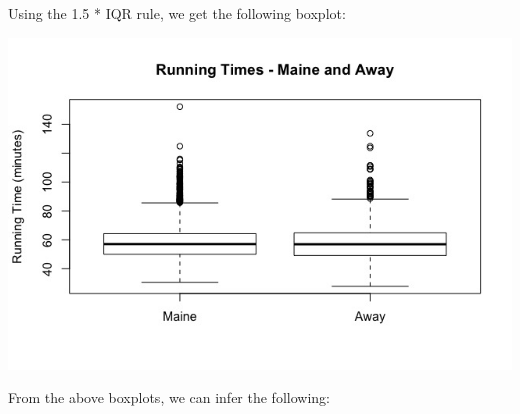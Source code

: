 \documentclass[12pt,letterpaper,titlepage,en-US]{article}
\begin{document}
Using the 1.5 * IQR rule, we get the following boxplot:
\begin{center}
\includegraphics[scale=0.6]{1c.jpeg}
\end{center}


From the above boxplots, we can infer the following:
\end{document}
